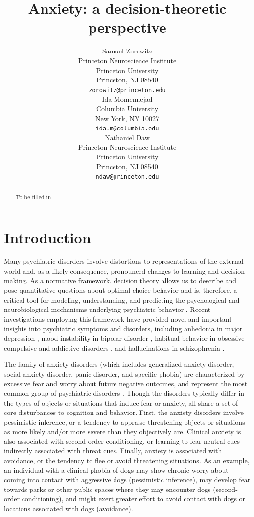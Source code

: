 \documentclass[11pt]{article} %
\title{Anxiety: a decision-theoretic perspective}
\author{
Samuel Zorowitz \\
Princeton Neuroscience Institute\\
Princeton University\\
Princeton, NJ 08540 \\
\texttt{zorowitz@princeton.edu} \\
\And
Ida Momennejad \\
Columbia University\\
New York, NY 10027 \\
\texttt{ida.m@columbia.edu} \\
\And
Nathaniel Daw \\
Princeton Neuroscience Institute\\
Princeton University\\
Princeton, NJ 08540 \\
\texttt{ndaw@princeton.edu} \\
}
\begin{document}
\maketitle

\begin{abstract}
To be filled in
\end{abstract}


\startmain

\section{Introduction}

Many psychiatric disorders involve distortions to representations of the external world and, as a likely consequence, pronounced changes to learning and decision making. As a normative framework, decision theory allows us to describe and pose quantita­tive questions about optimal choice behavior \citep{DayanDaw2008} and is, therefore, a critical tool for modeling, understanding, and predicting the psychological and neurobiological mechanisms underlying psychiatric behavior \citep{maia2011, HuysDawDayan2015}. Recent investigations employing this framework have provided novel and important insights into psychiatric symptoms and disorders, including anhedonia in major depression \citep{Rutledge2017}, mood instability in bipolar disorder \citep{EldarNiv2015, EldarDolanNiv2016}, habitual behavior in obsessive compulsive and addictive disorders \citep{gillan2016}, and hallucinations in schizophrenia \citep{powers2017, corlett2018}.

The family of anxiety disorders (which includes generalized anxiety disorder, social anxiety disorder, panic disorder, and specific phobia) are characterized by excessive fear and worry about future negative outcomes, and represent the most common group of psychiatric disorders \citep{kessler2009}. Though the disorders typically differ in the types of objects or situations that induce fear or anxiety, all share a set of core disturbances to cognition and behavior. First, the anxiety disorders involve pessimistic inference, or a tendency to appraise threatening objects or situations as more likely and/or more severe than they objectively are. Clinical anxiety is also associated with second-order conditioning, or learning to fear neutral cues indirectly associated with threat cues. Finally, anxiety is associated with avoidance, or the tendency to flee or avoid threatening situations. As an example, an individual with a clinical phobia of dogs may show chronic worry about coming into contact with aggressive dogs (pessimistic inference), may develop fear towards parks or other public spaces where they may encounter dogs (second-order conditioning), and might exert greater effort to avoid contact with dogs or locations associated with dogs (avoidance).
\end{document}
